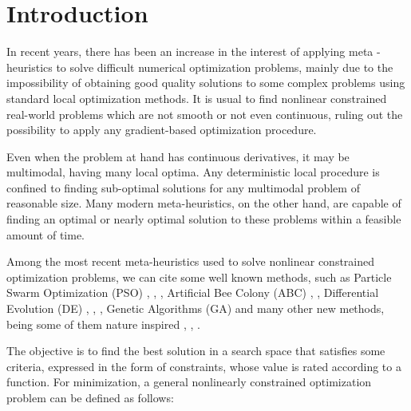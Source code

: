 \section{Introduction} \label{sec:Introduction}

In recent years, there has been an increase in the interest of applying meta -heuristics to solve difficult numerical optimization problems, mainly due to the impossibility of obtaining good quality solutions to some complex problems using standard local optimization methods. It is usual to find nonlinear constrained real-world problems which are not smooth or not even continuous, ruling out the possibility to apply any gradient-based optimization procedure.

Even when the problem at hand has continuous derivatives, it may be multimodal, having many local optima. Any deterministic local procedure is confined to finding sub-optimal solutions for any multimodal problem of reasonable size. Many modern meta-heuristics, on the other hand, are capable of finding an optimal or nearly optimal solution to these problems within a feasible amount of time.


Among the most recent meta-heuristics used to solve nonlinear constrained optimization problems, we can cite some well known methods, such as Particle Swarm Optimization (PSO) \cite{IPSO}, \cite{IAPSO}, \cite{PSO1}, Artificial Bee Colony (ABC) \cite{CB-ABC}, \cite{IABC-Mal}, Differential Evolution (DE) \cite{DE1}, \cite{DE2}, \cite{MVDE}, Genetic Algorithms (GA) \cite{GA1} and many other new methods, being some of them nature inspired \cite{CS}, \cite{WCA}, \cite{MBA}.

The objective is to find the best solution in a search space that satisfies some criteria, expressed in the form of constraints, whose value is rated according to a function. For minimization, a general nonlinearly constrained optimization problem can be defined as follows:

